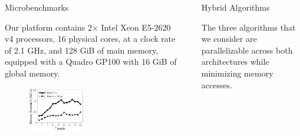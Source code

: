 \documentclass[final]{beamer}
\newlength{\sepwidth}
\newlength{\colwidth}
\newcommand{\separatorcolumn}{\begin{column}{\sepwidth}\end{column}}
\begin{document}
\begin{frame}[t]
\begin{columns}[t]
\begin{column}{\colwidth}
\begin{alertblock}{Microbenchmarks}
\begin{description}[font=$\bullet$~\normalfont\scshape\color{red!50!black}]
\item Our platform contains 2$\times$ Intel Xeon E5-2620 v4 processors, 16 physical cores, at a clock rate of 2.1 GHz, and 128 GiB of main memory, equipped with a Quadro GP100 with 16 GiB of global memory.

\end{description} 
\begin{figure}[htp]
\centering
    \includegraphics[height=0.25\textwidth, width=0.45\textwidth, trim={0.5cm 0.5cm 0.5cm 1cm}]{figures/microbenchmarks_time_vs_threads.pdf}	
   \label{fig:mem_bandwidth_scalability}
\end{figure}



\end{alertblock}


\end{column}

\separatorcolumn

\begin{column}{\colwidth}




 \begin{block}{Hybrid Algorithms}

 \begin{description}[font=$\bullet$~\normalfont\scshape\color{red!50!black}]
\item The three algorithms that we consider are parallelizable across both architectures while minimizing memory accesses. 



\end{description}
\end{block}
\end{column}
\end{columns}
\end{frame}
\end{document}
